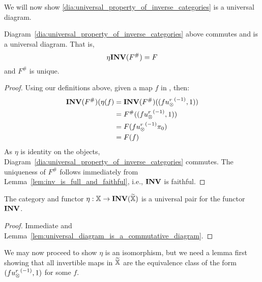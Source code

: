 We will now  show \ref{dia:universal_property_of_inverse_categories} is a universal diagram.


\begin{lemma}\label{lem:universal_diagram_is_a_commutative_diagram}
  Diagram~\ref{dia:universal_property_of_inverse_categories} above commutes and is a universal diagram.
  That is,
  \[
    \eta\mathbf{INV}({F^{\#}}) = F
  \]
  and $F^{\#}$ is unique.
\end{lemma}
\begin{proof}
  Using our definitions above, given a map $f$ in \X, then:
  \begin{align*}
    \mathbf{INV}({F^{\#}})(\eta(f) &= \mathbf{INV}({F^{\#}})((f{u_{\otimes}^r}^{(-1)},1))\\
    &= F^{\#}((f{u_{\otimes}^r}^{(-1)},1))\\
    &= F(f{u_{\otimes}^r}^{(-1)}\pi_0)\\
    &= F(f)\\
  \end{align*}
  As $\eta$ is identity on the objects, Diagram~\ref{dia:universal_property_of_inverse_categories}
  commutes.
  The uniqueness of $F^{\#}$ follows immediately from Lemma~\ref{lem:inv_is_full_and_faithful},
  i.e., $\mathbf{INV}$ is faithful.
\end{proof}
\begin{corollary}\label{cor:eta_and_xt_are_universal_for_inv}
  The category \Xt and functor $\eta:\mathbb{X}\to \mathbf{INV}({\widetilde{\mathbb{X}}})$ is a universal pair for the functor $\mathbf{INV}$.
\end{corollary}
\begin{proof}
  Immediate and Lemma~\ref{lem:universal_diagram_is_a_commutative_diagram}.
\end{proof}

We may now proceed to show $\eta$ is an isomorphism, but we need a lemma first showing that all
invertible maps in $\widetilde{\mathbb{X}}$ are the equivalence class of the form  $(f {u_{\otimes}^r}^{(-1)},1)$ for some $f$.

